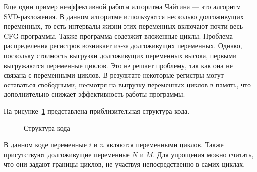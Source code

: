 Еще один пример неэффективной работы алгоритма Чайтина — это алгоритм SVD-разложения.  
В данном алгоритме используются несколько долгоживущих переменных,
то есть интервалы жизни этих переменных включают почти весь CFG программы.
Также программа содержит вложенные циклы.
Проблема распределения регистров возникает из-за долгоживущих переменных.  
Однако, поскольку стоимость выгрузки долгоживущих переменных высока, первыми выгружаются переменные циклов.  
Это не решает проблему, так как она не связана с переменными циклов.  
В результате некоторые регистры могут оставаться свободными, несмотря на выгрузку переменных циклов в память,  
что дополнительно снижает эффективность работы программы.

На рисунке~\ref{fig:structure} представлена приблизительная структура кода.

\begin{figure}[h]
    \centering
    \caption{Структура кода}
    \label{fig:structure}
\end{figure}

В данном коде переменные $i$ и $n$ являются переменными циклов.  
Также присутствуют долгоживущие переменные $N$ и $M$.  
Для упрощения можно считать, что они задают границы циклов, не участвуя непосредственно в самих циклах.

